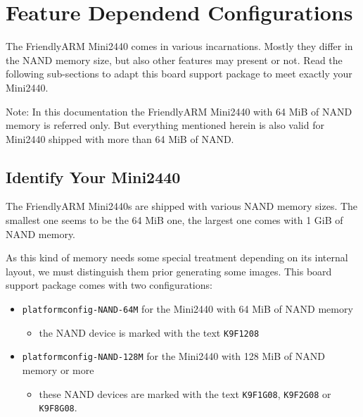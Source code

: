 %
%
%
%
%
%
%

\section{Feature Dependend Configurations}	\label{sec:featuremini2440}

The FriendlyARM Mini2440 comes in various incarnations. Mostly they differ in
the NAND memory size, but also other features may present or not. Read the
following sub-sections to adapt this board support package to meet exactly
your Mini2440.

Note: In this documentation the FriendlyARM Mini2440 with 64 MiB of NAND
memory is referred only. But everything mentioned herein is also valid for
Mini2440 shipped with more than 64 MiB of NAND.

\subsection{Identify Your Mini2440}		\label{sec:identifymini2440}

The FriendlyARM Mini2440s are shipped with various NAND memory sizes. The
smallest one seems to be the 64 MiB one, the largest one comes with 1 GiB
of NAND memory.

As this kind of memory needs some special treatment depending on its internal
layout, we must distinguish them prior generating some images. This board
support package comes with two configurations:

\begin{itemize}
 \item \texttt{platformconfig-NAND-64M} for the Mini2440 with 64
  MiB of NAND memory
  \begin{itemize}
   \item the NAND device is marked with the text \texttt{K9F1208}
  \end{itemize}
 \item \texttt{platformconfig-NAND-128M} for the Mini2440 with
  128 MiB of NAND memory or more
  \begin{itemize}
    \item these NAND devices are marked with the text \texttt{K9F1G08},
   \texttt{K9F2G08} or \texttt{K9F8G08}.
  \end{itemize}
\end{itemize}

